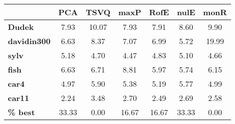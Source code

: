 \begin{tabular}{|l|c|c|c|c|c|c|}
\hline
&\textbf{PCA}&\textbf{TSVQ}&\textbf{maxP}&\textbf{RofE}&\textbf{nulE}&\textbf{monR}\\\hline
\textbf{Dudek}&7.93&10.07&7.93&7.91&8.60&9.90\\\hline
\textbf{davidin300}&6.63&8.37&7.07&6.99&5.72&19.99\\\hline
\textbf{sylv}&5.18&4.70&4.47&4.83&5.10&4.66\\\hline
\textbf{fish}&6.63&6.71&8.81&5.97&5.74&6.15\\\hline
\textbf{car4}&4.97&5.90&5.38&5.19&5.77&4.99\\\hline
\textbf{car11}&2.24&3.48&2.70&2.49&2.69&2.58\\\hline
\textbf{ \% best}&33.33&0.00&16.67&16.67&33.33&0.00\\\hline
\end{tabular}

